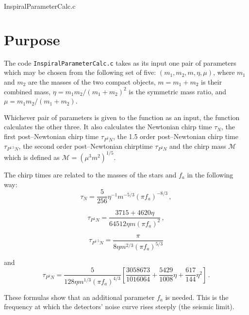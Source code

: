 \documentclass[12pt]{article}
\begin{document}
\huge
\begin{center}
InspiralParameterCalc.c
\end{center}
\normalsize
\vspace{10mm}

\section{Purpose}

The code \texttt{InspiralParameterCalc.c} takes as its input one pair of parameters which may be chosen from the following set of five: $(m_{1}, m_{2}, m, \eta, \mu)$, where $m_{1}$ and $m_{2}$ are the masses of the two compact objects, $m=m_{1}+m_{2}$ is their combined mass, $\eta=m_{1}m_{2}/(m_{1}+m_{2})^{2}$ is the symmetric mass ratio, and $\mu=m_{1}m_{2}/(m_{1}+m_{2})$.

Whichever pair of parameters is given to the function as an input, the function calculates the other three. It also calculates the Newtonian chirp time $\tau_{N}$, the first post--Newtonian chirp time $\tau_{P^{1}N}$, the 1.5 order post--Newtonian chirp time $\tau_{P^{1.5}N}$, the second order post--Newtonian chirptime $\tau_{P^{2}N}$ and the chirp mass $\mathcal{M}$ which is defined as $\mathcal{M}=(\mu^{3} m^{2})^{1/5}$.

The chirp times are related to the masses of the stars and $f_{a}$ in the following way:
\begin{equation}
\tau_{N} = \frac{5}{256} \eta^{-1} m^{-5/3} (\pi f_{a})^{-8/3} \,,
\end{equation}

\begin{equation}
\tau_{P^{1}N} = \frac{3715+4620 \eta}{64512 \eta m (\pi f_{a})^{2}} \,,
\end{equation}

\begin{equation}
\tau_{P^{1.5}N} = \frac{\pi}{8 \eta m^{2/3} (\pi f_{a})^{5/3}}
\end{equation}

and
\begin{equation}
\tau_{P^{2}N} = \frac{5}{128 \eta m^{1/3} (\pi f_{a})^{4/3}} \left[ \frac{3058673}{1016064} + \frac{5429}{1008} \eta + \frac{617}{144} \eta^{2} \right] \,.
\end{equation}

These formulas show that an additional parameter $f_{a}$ is needed. This is the frequency at which the detectors' noise curve rises steeply (the seismic limit).
\end{document}
